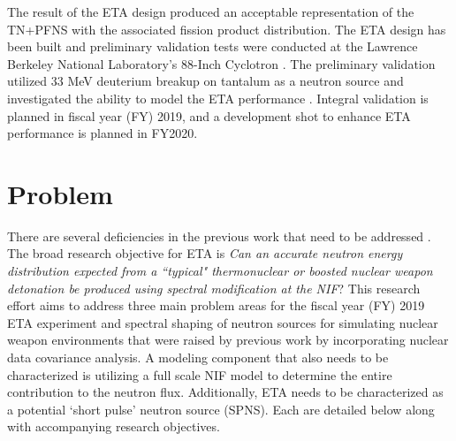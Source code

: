 The result of the ETA design produced an acceptable representation of the TN+PFNS with the associated fission product distribution. 
The ETA design has been built and preliminary validation tests were conducted at the Lawrence Berkeley National Laboratory’s 88-Inch Cyclotron \cite{Bevins, Stickney}. 
The preliminary validation utilized 33 MeV deuterium breakup on tantalum as a neutron source and investigated the ability to model the ETA performance \cite{Stickney}.
Integral validation is planned in fiscal year (FY) 2019, and a development shot to enhance ETA performance is planned in FY2020. 

 
\section{Problem} \label{problem}

There are several deficiencies in the previous work that need to be addressed \cite{Bevins}. The broad research objective for ETA is \textit{Can an accurate neutron energy distribution expected from a ``typical" thermonuclear or boosted nuclear weapon detonation be produced using spectral modification at the NIF}?
This research effort aims to address three main problem areas for the fiscal year (FY) 2019 ETA experiment and spectral shaping of neutron sources for simulating nuclear weapon environments that were raised by previous work by incorporating nuclear data covariance analysis.
A modeling component that also needs to be characterized is utilizing a full scale NIF model to determine the entire contribution to the neutron flux.  
Additionally, ETA needs to be characterized as a potential `short pulse' neutron source (SPNS). Each are detailed below along with accompanying research objectives.  

